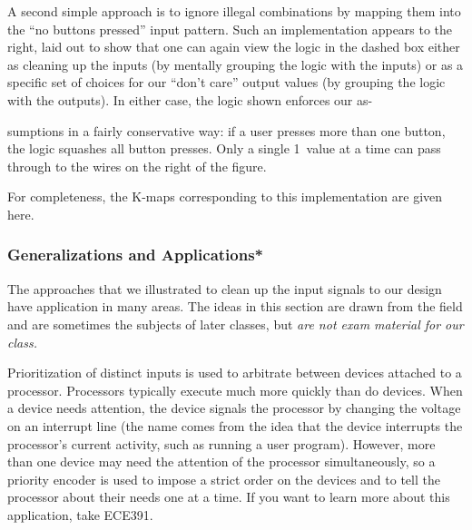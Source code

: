 \begin{minipage}{2.45in}
A second simple approach is to ignore illegal
combinations by mapping them into the ``no buttons pressed'' 
input pattern.
%
Such an implementation appears to the right, laid out to show that
one can again view the logic in the dashed box either as cleaning up 
the inputs (by mentally grouping the logic with the inputs) or as a specific 
set of choices for our ``don't care'' output values (by grouping the 
logic with the outputs).
%
In either case, the logic shown 
enforces our as-\linebreak
\end{minipage}\hspace{.25in}%
\begin{minipage}{3.8in}
\vspace{12pt}
\end{minipage}\mpdone

sumptions in a fairly conservative way:
if a user presses more than one button, the logic squashes all button
presses.  Only a single 1~value at a time can pass through to 
the wires on the right of the figure.

\pagebreak

For completeness, the K-maps corresponding to this implementation are given
here.\\

\centerline{\hspace{.25in}\hspace{.25in}\hspace{.25in}}\vspace{12pt}


\subsubsection{Generalizations and Applications*}

The approaches that we illustrated to clean up the input signals to
our design have application in many areas.  The ideas in this 
section are drawn from the field and are sometimes the subjects of 
later classes, but {\em are not exam material for our class.}

Prioritization of distinct
inputs is used to arbitrate between devices attached to a
processor.  Processors typically execute much more quickly than do devices.
When a device needs attention, the device signals the processor
by changing the voltage on an interrupt line (the name comes from the
idea that the device interrupts the processor's current activity, such
as running a user program).  However, more than
one device may need the attention of the processor simultaneously, so
a priority encoder is used to impose a strict order on the devices and
to tell the processor about their needs one at a time.
%
If you want to learn more about this application, take ECE391.

